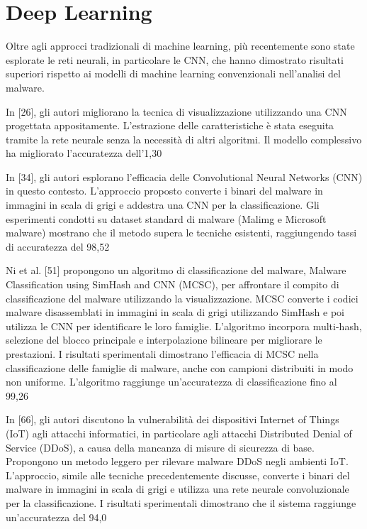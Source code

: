 \section{Deep Learning}
Oltre agli approcci tradizionali di machine learning, più recentemente sono state esplorate le reti neurali, in particolare le CNN, che hanno dimostrato risultati superiori rispetto ai modelli di machine learning convenzionali nell'analisi del malware.

In [26], gli autori migliorano la tecnica di visualizzazione utilizzando una CNN progettata appositamente. L'estrazione delle caratteristiche è stata eseguita tramite la rete neurale senza la necessità di altri algoritmi. Il modello complessivo ha migliorato l'accuratezza dell'1,30%

In [34], gli autori esplorano l'efficacia delle Convolutional Neural Networks (CNN) in questo contesto. L'approccio proposto converte i binari del malware in immagini in scala di grigi e addestra una CNN per la classificazione. Gli esperimenti condotti su dataset standard di malware (Malimg e Microsoft malware) mostrano che il metodo supera le tecniche esistenti, raggiungendo tassi di accuratezza del 98,52%

Ni et al. [51] propongono un algoritmo di classificazione del malware, Malware Classification using SimHash and CNN (MCSC), per affrontare il compito di classificazione del malware utilizzando la visualizzazione. MCSC converte i codici malware disassemblati in immagini in scala di grigi utilizzando SimHash e poi utilizza le CNN per identificare le loro famiglie. L'algoritmo incorpora multi-hash, selezione del blocco principale e interpolazione bilineare per migliorare le prestazioni. I risultati sperimentali dimostrano l'efficacia di MCSC nella classificazione delle famiglie di malware, anche con campioni distribuiti in modo non uniforme. L'algoritmo raggiunge un'accuratezza di classificazione fino al 99,26%

In [66], gli autori discutono la vulnerabilità dei dispositivi Internet of Things (IoT) agli attacchi informatici, in particolare agli attacchi Distributed Denial of Service (DDoS), a causa della mancanza di misure di sicurezza di base. Propongono un metodo leggero per rilevare malware DDoS negli ambienti IoT. L'approccio, simile alle tecniche precedentemente discusse, converte i binari del malware in immagini in scala di grigi e utilizza una rete neurale convoluzionale per la classificazione. I risultati sperimentali dimostrano che il sistema raggiunge un'accuratezza del 94,0%

